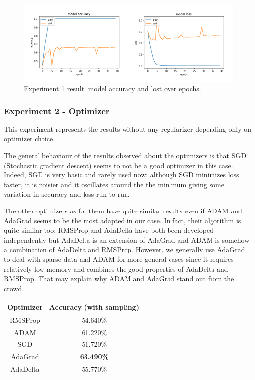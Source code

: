 \documentclass[11pt, openany]{report}
\theoremstyle{plain}
\theoremstyle{definition}
\theoremstyle{remark}
\begin{document}
\begin{figure}[H]
  \centering
  \includegraphics[scale=0.6]{Code/figures_result/40epochs_sample_withoutoptimisation.PNG}
  \caption{Experiment 1 result: model accuracy and lost over epochs.}
  \label{fig:cifar_epoch_res}
\end{figure}
 
\subsubsection{Experiment 2 - Optimizer} 

This experiment represents the results without any regularizer depending only on optimizer choice.

The general behaviour of the results observed about the optimizers is that SGD (Stochastic gradient descent) seems to not be a good optimizer in this case. Indeed, SGD is very basic and rarely used now: although SGD minimizes loss faster, it is noisier and it oscillates around the the minimum giving some variation in accuracy and loss run to run.

The other optimizers as for them have quite similar results even if ADAM and AdaGrad seems to be the most adapted in our case. In fact, their algorithm is quite similar too: RMSProp and AdaDelta have both been developed independently but AdaDelta is an extension of AdaGrad and ADAM is somehow a combination of AdaDelta and RMSProp. However, we generally use AdaGrad to deal with sparse data and ADAM for more general cases since it requires relatively low memory and combines the good properties of AdaDelta and RMSProp. That may explain why ADAM and AdaGrad stand out from the crowd. 

\begin{center}
\begin{tabular}{|c|c|}
  \hline
  Optimizer & Accuracy (with sampling) \\
  \hline
  RMSProp & 54.640\% \\
  ADAM  & 61.220\% \\
  SGD & 51.720\% \\
  AdaGrad & \textbf{63.490\%} \\
  AdaDelta & 55.770\% \\
  \hline
\end{tabular}
\end{center}
\end{document}
